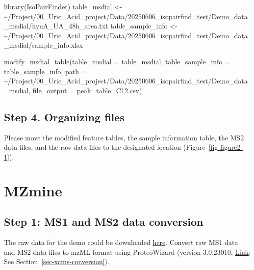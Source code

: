 \documentclass[
  letterpaper,
  DIV=11,
  numbers=noendperiod]{scrreprt}
\newenvironment{Shaded}{\begin{snugshade}}{\end{snugshade}}
\newcommand{\AttributeTok}[1]{\textcolor[rgb]{0.40,0.45,0.13}{#1}}
\newcommand{\FunctionTok}[1]{\textcolor[rgb]{0.28,0.35,0.67}{#1}}
\newcommand{\NormalTok}[1]{\textcolor[rgb]{0.00,0.23,0.31}{#1}}
\newcommand{\OtherTok}[1]{\textcolor[rgb]{0.00,0.23,0.31}{#1}}
\newcommand{\StringTok}[1]{\textcolor[rgb]{0.13,0.47,0.30}{#1}}
\begin{document}
\begin{Shaded}
\begin{Highlighting}[]
\FunctionTok{library}\NormalTok{(IsoPairFinder)}
\NormalTok{table\_msdial }\OtherTok{\textless{}{-}} \StringTok{\textquotesingle{}\textasciitilde{}/Project/00\_Uric\_Acid\_project/Data/20250606\_isopairfind\_test/Demo\_data\_msdial/hyuA\_UA\_48h\_area.txt\textquotesingle{}}
\NormalTok{table\_sample\_info }\OtherTok{\textless{}{-}} \StringTok{\textquotesingle{}\textasciitilde{}/Project/00\_Uric\_Acid\_project/Data/20250606\_isopairfind\_test/Demo\_data\_msdial/sample\_info.xlsx\textquotesingle{}}

\FunctionTok{modify\_msdial\_table}\NormalTok{(}\AttributeTok{table\_msdial =}\NormalTok{ table\_msdial,}
                    \AttributeTok{table\_sample\_info =}\NormalTok{ table\_sample\_info,}
                    \AttributeTok{path =} \StringTok{\textquotesingle{}\textasciitilde{}/Project/00\_Uric\_Acid\_project/Data/20250606\_isopairfind\_test/Demo\_data\_msdial\textquotesingle{}}\NormalTok{,}
                    \AttributeTok{file\_output =} \StringTok{\textquotesingle{}peak\_table\_C12.csv\textquotesingle{}}\NormalTok{)}
\end{Highlighting}
\end{Shaded}

\subsection{Step 4. Organizing files}\label{step-4.-organizing-files-1}

Please move the modified feature tables, the sample information table,
the MS2 data files, and the raw data files to the designated location
(Figure~\ref{fig-figure2-1}).

\section{MZmine}\label{sec-mzmine}

\subsection{Step 1: MS1 and MS2 data
conversion}\label{step-1-ms1-and-ms2-data-conversion-1}

The raw data for the demo could be downloaded
\href{https://github.com/DoddLab/IsoPairFinder_DemoData_DiffTools/tree/main/00_raw_data}{here}.
Convert raw MS1 data and MS2 data files to mzML format using
ProteoWizard (version 3.0.23010,
\href{https://proteowizard.sourceforge.io/}{Link}; See
Section~\ref{sec-xcms-conversion}).
\end{document}
